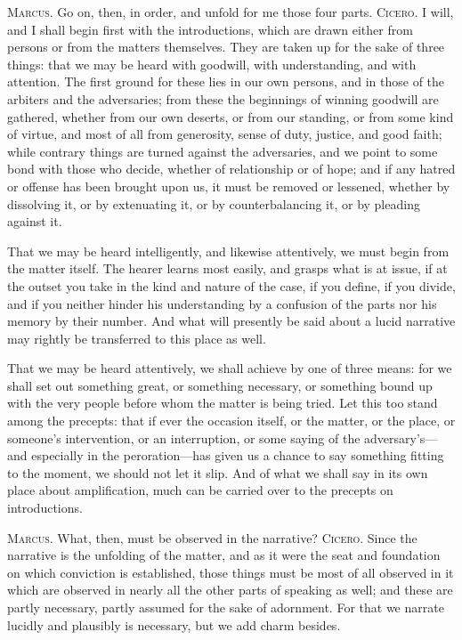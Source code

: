  \textsc{Marcus.} Go on, then, in order, and unfold for me those four parts. \textsc{Cicero.} I will, and I shall begin first with the introductions, which are drawn either from persons or from the matters themselves. They are taken up for the sake of three things: that we may be heard with goodwill, with understanding, and with attention. The first ground for these lies in our own persons, and in those of the arbiters and the adversaries; from these the beginnings of winning goodwill are gathered, whether from our own deserts, or from our standing, or from some kind of virtue, and most of all from generosity, sense of duty, justice, and good faith; while contrary things are turned against the adversaries, and we point to some bond with those who decide, whether of relationship or of hope; and if any hatred or offense has been brought upon us, it must be removed or lessened, whether by dissolving it, or by extenuating it, or by counterbalancing it, or by pleading against it.

 That we may be heard intelligently, and likewise attentively, we must begin from the matter itself. The hearer learns most easily, and grasps what is at issue, if at the outset you take in the kind and nature of the case, if you define, if you divide, and if you neither hinder his understanding by a confusion of the parts nor his memory by their number. And what will presently be said about a lucid narrative may rightly be transferred to this place as well.

 That we may be heard attentively, we shall achieve by one of three means: for we shall set out something great, or something necessary, or something bound up with the very people before whom the matter is being tried. Let this too stand among the precepts: that if ever the occasion itself, or the matter, or the place, or someone's intervention, or an interruption, or some saying of the adversary's—and especially in the peroration—has given us a chance to say something fitting to the moment, we should not let it slip. And of what we shall say in its own place about amplification, much can be carried over to the precepts on introductions.

 \textsc{Marcus.} What, then, must be observed in the narrative? \textsc{Cicero.} Since the narrative is the unfolding of the matter, and as it were the seat and foundation on which conviction is established, those things must be most of all observed in it which are observed in nearly all the other parts of speaking as well; and these are partly necessary, partly assumed for the sake of adornment. For that we narrate lucidly and plausibly is necessary, but we add charm besides.

